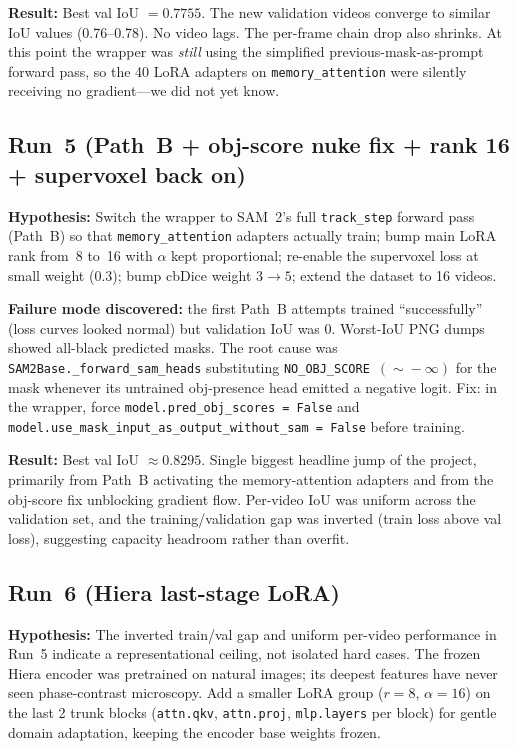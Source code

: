\documentclass[11pt,a4paper]{article}
\begin{document}
\textbf{Result:} Best val IoU $= 0.7755$. The new validation videos
converge to similar IoU values (0.76--0.78). No video lags. The
per-frame chain drop also shrinks. At this point the wrapper was
\emph{still} using the simplified previous-mask-as-prompt forward
pass, so the 40 LoRA adapters on \texttt{memory\_attention} were
silently receiving no gradient---we did not yet know.

\subsection{Run~5 (Path~B + obj-score nuke fix + rank 16 + supervoxel back on)}

\textbf{Hypothesis:} Switch the wrapper to SAM~2's full
\texttt{track\_step} forward pass (Path~B) so that
\texttt{memory\_attention} adapters actually train; bump main LoRA
rank from~8 to~16 with $\alpha$ kept proportional; re-enable the
supervoxel loss at small weight ($0.3$); bump cbDice weight $3 \to 5$;
extend the dataset to 16 videos.

\textbf{Failure mode discovered:} the first Path~B attempts trained
``successfully'' (loss curves looked normal) but validation IoU was
$0$. Worst-IoU PNG dumps showed all-black predicted masks. The
root cause was \texttt{SAM2Base.\_forward\_sam\_heads} substituting
\texttt{NO\_OBJ\_SCORE}~$(\!\sim\!-\infty)$ for the mask whenever its
untrained obj-presence head emitted a negative logit. Fix: in the
wrapper, force
\texttt{model.pred\_obj\_scores~=~False} and
\texttt{model.use\_mask\_input\_as\_output\_without\_sam~=~False}
before training.

\textbf{Result:} Best val IoU $\approx 0.8295$. Single biggest
headline jump of the project, primarily from Path~B activating the
memory-attention adapters and from the obj-score fix unblocking
gradient flow. Per-video IoU was uniform across the validation set,
and the training/validation gap was inverted (train loss above val
loss), suggesting capacity headroom rather than overfit.

\subsection{Run~6 (Hiera last-stage LoRA)}

\textbf{Hypothesis:} The inverted train/val gap and uniform per-video
performance in Run~5 indicate a representational ceiling, not isolated
hard cases. The frozen Hiera encoder was pretrained on natural images;
its deepest features have never seen phase-contrast microscopy. Add
a smaller LoRA group ($r{=}8$, $\alpha{=}16$) on the last 2 trunk
blocks (\texttt{attn.qkv}, \texttt{attn.proj}, \texttt{mlp.layers}
per block) for gentle domain adaptation, keeping the encoder base
weights frozen.
\end{document}
